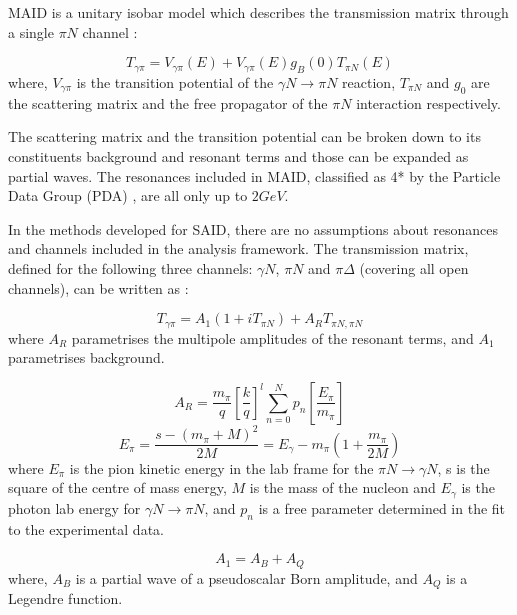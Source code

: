 \indent MAID is a unitary isobar model which describes the transmission matrix through a single $\pi N$ channel \cite {drechsel}:

\begin{equation}
T_{\gamma\pi}=V_{\gamma\pi}(E)+V_{\gamma\pi}(E)g_{B}(0)T_{\pi N}(E)
\end{equation}
where, $V_{\gamma\pi}$ is the transition potential of the $\gamma N\rightarrow \pi N$ reaction, $T_{\pi N}$ and $g_{0}$ are the scattering matrix and the free propagator of the $\pi N$ interaction respectively.

\indent The scattering matrix and the transition potential can be broken down to its constituents background and resonant terms and those can be expanded as partial waves. The resonances included in MAID, classified as 4* by the Particle Data Group (PDA) \cite{pda}, are all only up to $2GeV$.

\indent In the methods developed for SAID, there are no assumptions about resonances and channels included in the analysis framework. The transmission matrix, defined for the following three channels: $\gamma N$, $\pi N$ and $\pi \Delta$ (covering all open channels), can be written as \cite{arndt}:

\begin{equation}
T_{\gamma\pi}=A_{1}(1+iT_{\pi N})+A_{R}T_{\pi N,\pi N}
\end{equation}
where $A_{R}$ parametrises the multipole amplitudes of the resonant terms, and $A_{1}$ parametrises background.

\begin{equation}
A_{R}=\frac{m_{\pi}}{q}[\frac{k}{q}]^{l}\sum\limits_{n=0}^{N}p_{n}[\frac{E_{\pi}}{m_{\pi}}]
\end{equation}
\begin{equation}
E_{\pi}=\frac{s-(m_{\pi}+M)^{2}}{2M}=E_{\gamma}-m_{\pi}(1+\frac{m_{\pi}}{2M})
\end{equation}
where $E_{\pi}$ is the pion kinetic energy in the lab frame for the $\pi N\rightarrow \gamma N$, s is the square of the centre of mass energy, $M$ is the mass of the nucleon and $E_{\gamma}$ is the photon lab energy for $\gamma N \rightarrow \pi N$, and $p_{n}$ is a free parameter determined in the fit to the experimental data.

\begin{equation}
A_{1}=A_{B}+A_{Q}
\end{equation}
where, $A_{B}$ is a partial wave of a pseudoscalar Born amplitude, and $A_{Q}$ is a Legendre function.

